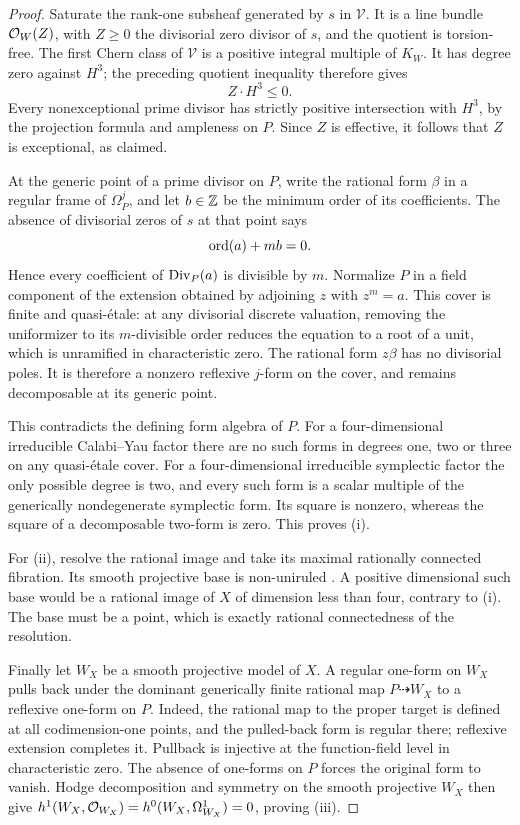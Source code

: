 \begin{proof}
Saturate the rank-one subsheaf generated by \(s\) in \(\mathcal V\).
It is a line bundle \(\mathcal O_W(Z)\), with \(Z\ge0\) the divisorial zero
divisor of \(s\), and the quotient is torsion-free.  The first Chern
class of \(\mathcal V\) is a positive integral multiple of \(K_W\).
It has degree zero against \(H^3\); the preceding quotient inequality
therefore gives
\[
                              Z\cdot H^3\le0.
\]
Every nonexceptional prime divisor has strictly positive intersection
with \(H^3\), by the projection formula and ampleness on \(P\).
Since \(Z\) is effective, it follows that \(Z\) is exceptional, as
claimed.

At the generic point of a prime divisor on \(P\), write the rational
form \(\beta\) in a regular frame of \(\Omega_P^j\), and let \(b\in\mathbb Z\)
be the minimum order of its coefficients.  The absence of divisorial
zeros of \(s\) at that point says
\[
                            \operatorname{ord}(a)+mb=0.
\]
Hence every coefficient of \(\operatorname{Div}_P(a)\) is divisible by \(m\).
Normalize \(P\) in a field component of the extension obtained by
adjoining \(z\) with \(z^m=a\).  This cover is finite and quasi-\'etale:
at any divisorial discrete valuation, removing the uniformizer to its
\(m\)-divisible order reduces the equation to a root of a unit, which
is unramified in characteristic zero.  The rational form \(z\beta\)
has no divisorial poles.  It is therefore a nonzero reflexive
\(j\)-form on the cover, and remains decomposable at its generic point.

This contradicts the defining form algebra of \(P\).  For a
four-dimensional irreducible Calabi--Yau factor there are no such
forms in degrees one, two or three on any quasi-\'etale cover.  For a
four-dimensional irreducible symplectic factor the only possible
degree is two, and every such form is a scalar multiple of the
generically nondegenerate symplectic form.  Its square is nonzero,
whereas the square of a decomposable two-form is zero.  This proves (i).

For (ii), resolve the rational image and take its maximal rationally
connected fibration.  Its smooth projective base is non-uniruled
\cite[Corollary~1.4]{GHS2003}.  A positive dimensional such base would
be a rational image of \(X\) of dimension less than four, contrary to
(i).  The base must be a point, which is exactly rational
connectedness of the resolution.

Finally let \(W_X\) be a smooth projective model of \(X\).  A regular
one-form on \(W_X\) pulls back under the dominant generically finite
rational map \(P\dashrightarrow W_X\) to a reflexive one-form on
\(P\).  Indeed, the rational map to the proper target is defined at
all codimension-one points, and the pulled-back form is regular there;
reflexive extension completes it.  Pullback is injective at the
function-field level in characteristic zero.  The absence of
one-forms on \(P\) forces the original form to vanish.  Hodge
decomposition and symmetry on the smooth projective \(W_X\) then give
\(h^1(W_X,\mathcal O_{W_X})=h^0(W_X,\Omega^1_{W_X})=0\), proving (iii).
\end{proof}

